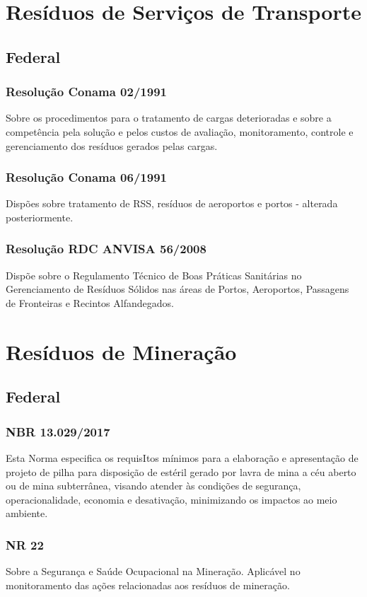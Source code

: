 \section{Resíduos de Serviços de Transporte}
\begin{subapend}
	\subsection{Federal}
	\begin{subsubapend}
		\item \subsubsection{Resolução Conama 02/1991}
		Sobre os procedimentos para o tratamento de cargas deterioradas e sobre a competência pela solução e pelos custos de avaliação, monitoramento, controle e gerenciamento dos resíduos gerados pelas cargas.
		\subsubsection{Resolução Conama 06/1991}
		Dispões sobre tratamento de RSS, resíduos de aeroportos e portos - alterada posteriormente.
		\subsubsection{Resolução RDC ANVISA 56/2008}
		Dispõe sobre o Regulamento Técnico de Boas Práticas Sanitárias no Gerenciamento de Resíduos Sólidos nas áreas de Portos, Aeroportos, Passagens de Fronteiras e Re­cintos Alfandegados.
	\end{subsubapend}
\end{subapend}

\section{Resíduos de Mineração}

\begin{subapend}
	\subsection{Federal}
	\begin{subsubapend}
		\item \subsubsection{NBR 13.029/2017}
		Esta Norma especifica os requisItos mínimos para a elaboração e apresentação de projeto de pilha para disposição de estéril gerado por lavra de mina a céu aberto ou de mina subterrânea, visando atender às condições de segurança, operacionalidade, economia e desativação, minimizando os impactos ao meio ambiente.
		\subsubsection{NR 22}
		Sobre a Segurança e Saúde Ocupacional na Mineração. Aplicável no monitoramento das ações relacionadas aos resíduos de mineração.
	\end{subsubapend}
\end{subapend}


